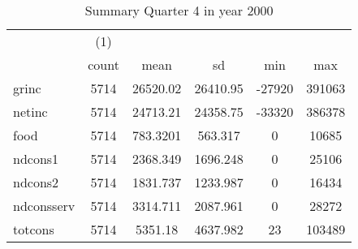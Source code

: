 \begin{table}[htbp]\centering
\def\sym#1{\ifmmode^{#1}\else\(^{#1}\)\fi}
\caption{Summary Quarter 4 in year 2000 \label{sum\_Q4\_y2000}}
\begin{tabular}{l*{1}{ccccc}}
\hline\hline
            &\multicolumn{1}{c}{(1)}&            &            &            &            \\
            &       count&        mean&          sd&         min&         max\\
\hline
grinc       &        5714&    26520.02&    26410.95&      -27920&      391063\\
netinc      &        5714&    24713.21&    24358.75&      -33320&      386378\\
food        &        5714&    783.3201&     563.317&           0&       10685\\
ndcons1     &        5714&    2368.349&    1696.248&           0&       25106\\
ndcons2     &        5714&    1831.737&    1233.987&           0&       16434\\
ndconsserv  &        5714&    3314.711&    2087.961&           0&       28272\\
totcons     &        5714&     5351.18&    4637.982&          23&      103489\\
\hline\hline
\end{tabular}
\end{table}
